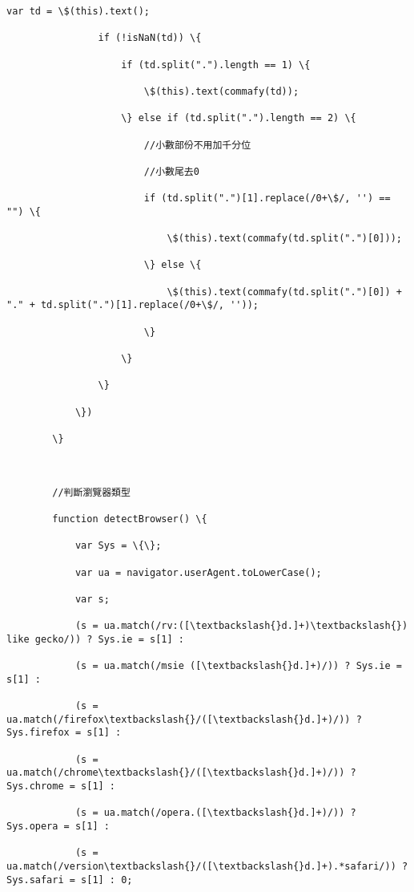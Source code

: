 \documentclass[11pt]{article}
\begin{document}
\begin{Verbatim}[commandchars=\\\{\}]
                var td = \$(this).text();

                if (!isNaN(td)) \{

                    if (td.split(".").length == 1) \{

                        \$(this).text(commafy(td));

                    \} else if (td.split(".").length == 2) \{

                        //小數部份不用加千分位

                        //小數尾去0

                        if (td.split(".")[1].replace(/0+\$/, '') == "") \{

                            \$(this).text(commafy(td.split(".")[0]));

                        \} else \{

                            \$(this).text(commafy(td.split(".")[0]) + "." + td.split(".")[1].replace(/0+\$/, ''));

                        \}

                    \}

                \}

            \})

        \}



        //判斷瀏覽器類型

        function detectBrowser() \{

            var Sys = \{\};

            var ua = navigator.userAgent.toLowerCase();

            var s;

            (s = ua.match(/rv:([\textbackslash{}d.]+)\textbackslash{}) like gecko/)) ? Sys.ie = s[1] :

            (s = ua.match(/msie ([\textbackslash{}d.]+)/)) ? Sys.ie = s[1] :

            (s = ua.match(/firefox\textbackslash{}/([\textbackslash{}d.]+)/)) ? Sys.firefox = s[1] :

            (s = ua.match(/chrome\textbackslash{}/([\textbackslash{}d.]+)/)) ? Sys.chrome = s[1] :

            (s = ua.match(/opera.([\textbackslash{}d.]+)/)) ? Sys.opera = s[1] :

            (s = ua.match(/version\textbackslash{}/([\textbackslash{}d.]+).*safari/)) ? Sys.safari = s[1] : 0;




\end{Verbatim}
\end{document}
